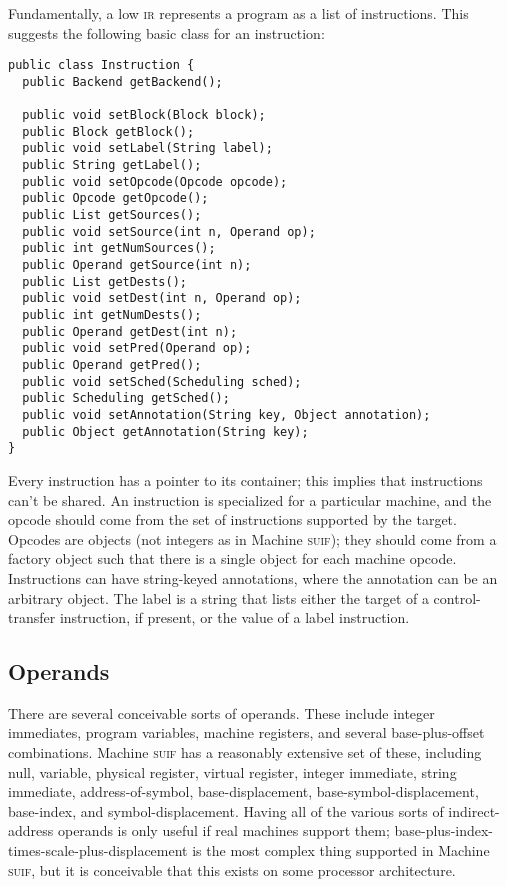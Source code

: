 \documentclass[11pt]{article}
\def\ir{\textsc{ir}}
\def\suif{\textsc{suif}}
\def\machsuif{Machine \suif}
\begin{document}
Fundamentally, a low \ir{} represents a program as a list of
instructions.  This suggests the following basic class for an
instruction:

\begin{verbatim}
public class Instruction {
  public Backend getBackend();

  public void setBlock(Block block);
  public Block getBlock();
  public void setLabel(String label);
  public String getLabel();
  public void setOpcode(Opcode opcode);
  public Opcode getOpcode();
  public List getSources();
  public void setSource(int n, Operand op);
  public int getNumSources();
  public Operand getSource(int n);
  public List getDests();
  public void setDest(int n, Operand op);
  public int getNumDests();
  public Operand getDest(int n);
  public void setPred(Operand op);
  public Operand getPred();
  public void setSched(Scheduling sched);
  public Scheduling getSched();
  public void setAnnotation(String key, Object annotation);
  public Object getAnnotation(String key);
}
\end{verbatim}

Every instruction has a pointer to its container; this implies that
instructions can't be shared.  An instruction is specialized for a
particular machine, and the opcode should come from the set of
instructions supported by the target.  Opcodes are objects (not
integers as in \machsuif); they should come from a factory object such
that there is a single object for each machine opcode.  Instructions
can have string-keyed annotations, where the annotation can be an
arbitrary object.  The label is a string that lists either the target
of a control-transfer instruction, if present, or the value of a label
instruction.

\subsection{Operands}

There are several conceivable sorts of operands.  These include
integer immediates, program variables, machine registers, and several
base-plus-offset combinations.  \machsuif{} has a reasonably extensive
set of these, including null, variable, physical register, virtual
register, integer immediate, string immediate, address-of-symbol,
base-displacement, base-symbol-displacement, base-index, and
symbol-displacement.  Having all of the various sorts of
indirect-address operands is only useful if real machines support
them; base-plus-index-times-scale-plus-displacement is the most
complex thing supported in \machsuif, but it is conceivable that this
exists on some processor architecture.
\end{document}
